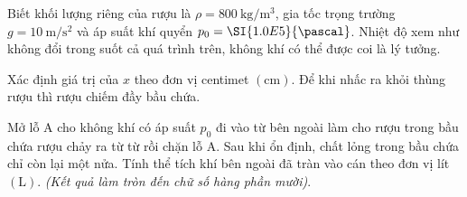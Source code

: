 Biết khối lượng riêng của rượu là $\rho=\SI{800}{\kilogram/\meter^3}$, gia tốc trọng trường $g=\SI{10}{\meter/\second^2}$ và áp suất khí quyển $p_0=\SI{1.0E5}{\pascal}$. Nhiệt độ xem như không đổi trong suốt cả quá trình trên, không khí có thể được coi là lý tưởng.
\begin{ex}
	Xác định giá trị của $x$ theo đơn vị centimet $\left(\si{\centi\meter}\right)$. Để khi nhấc ra khỏi thùng rượu thì rượu chiếm đầy bầu chứa.
\end{ex}
\begin{ex}
	Mở lỗ A cho không khí có áp suất $p_0$ đi vào từ bên ngoài làm cho rượu trong bầu chứa rượu chảy ra từ từ rồi chặn lỗ A. Sau khi ổn định, chất lỏng trong bầu chứa chỉ còn lại một nửa. Tính thể tích khí bên ngoài đã tràn vào cán theo đơn vị lít $\left(\si{\liter}\right)$. \textit{(Kết quả làm tròn đến chữ số hàng phần mười)}.
\end{ex}